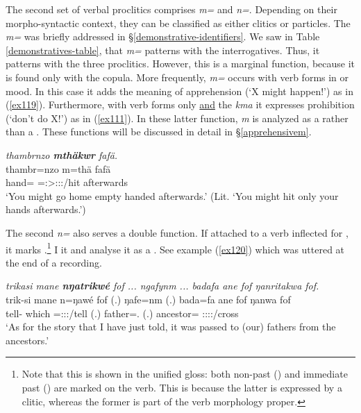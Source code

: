 The second set of verbal proclitics comprises \emph{m=} and \emph{n=}. Depending on their morpho-syntactic context, they can be classified as either clitics or particles. The \emph{m=}  was briefly addressed in \S{}\ref{demonstrative-identifiers}. We saw in Table \ref{demonstratives-table}, that \emph{m=} patterns with the interrogatives. Thus, it patterns with the three  proclitics. However, this is a marginal function, because it is found only with the copula. More frequently, \emph{m=} occurs with verb forms in  or  mood. In this case it adds the meaning of apprehension (`X might happen!') as in (\ref{ex119}). Furthermore, with  verb forms only \underline{and} the   \emph{kma} it expresses prohibition (`don't do X!') as in (\ref{ex111}). In these latter function, \emph{m} is analyzed as a  rather than a . These functions will be discussed in detail in \S{}\ref{apprehensivem}.

\begin{exe}
	\ex \emph{thambrnzo \textbf{mthäkwr} fafä.}\\
	\gll thambr=nzo m=thä fafä\\
	hand=\Only{} \Appr{}=\Ssg:\Sbj>\Stpl:\Obj:\Imp:\Pfv/hit afterwards\\
	\trans `You might go home empty handed afterwards.' (Lit. `You might hit only your hands afterwards.')
	\label{ex119}
\end{exe}

The second  \emph{n=} also serves a double function. If attached to a verb inflected for , it marks .\footnote{Note that this is shown in the unified gloss: both non-past (\Nonpast) and immediate past (\Immpst) are marked on the verb. This is because the latter is expressed by a clitic, whereas the former is part of the verb morphology proper.} I  it \Immpst{} and analyse it as a . See example (\ref{ex120}) which was uttered at the end of a recording.

\begin{exe}
	\ex \emph{trikasi mane \textbf{nŋatrikwé} fof ... ngafynm ... badafa ane fof ŋanritakwa fof.}\\
	\gll trik-si mane n=ŋawé fof (.) ŋafe=nm (.) bada=fa ane fof ŋanwa fof\\
	tell-\Nmlz{} which \Immpst=\Fsg:\Sbj:\Nonpast:\Ipfv/tell \Emph{} (.) father=\Dat{}.\Nsg{} (.) ancestor=\Abl{} \Dem{} \Emph{} \Stsg:\Sbj:\Pst:\Ipfv:\Venit/cross \Emph{}\\
	\trans `As for the story that I have just told, it was passed to (our) fathers from the ancestors.'
	\label{ex120}
\end{exe}

